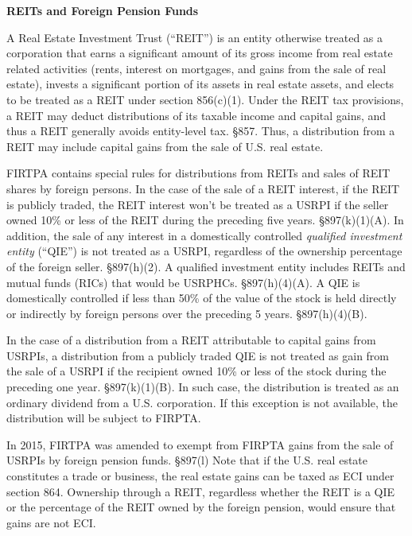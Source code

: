 \begin{center}
\textbf{REITs and Foreign Pension Funds}
\end{center}

A Real Estate Investment Trust (``REIT'') is an entity otherwise treated as a corporation that earns a significant amount of its gross income from real estate related activities (rents, interest on mortgages, and gains from the sale of real estate), invests a significant portion of its assets in real estate assets, and elects to be treated as a REIT under section 856(c)(1).  Under the REIT tax provisions, a REIT may deduct distributions of its taxable income and capital gains, and thus a REIT generally avoids entity-level tax. \S 857.  Thus, a distribution from a REIT may include capital gains from the sale of U.S. real estate.  

FIRTPA contains special rules for distributions from REITs and sales of REIT shares by foreign persons. In the case of the sale of a REIT interest, if the REIT is publicly traded, the REIT interest won't be treated as a USRPI if the seller owned 10\% or less of the REIT during the preceding five years.  \S897(k)(1)(A).  In addition, the sale of any interest in a domestically controlled \emph{qualified investment entity} (``QIE'') is not treated as a USRPI, regardless of the ownership percentage of the foreign seller.  \S897(h)(2).  A qualified investment entity includes REITs and mutual funds (RICs) that would be USRPHCs.  \S897(h)(4)(A).  A QIE is domestically controlled if less than 50\% of the value of the stock is held directly or indirectly by foreign persons over the preceding 5 years.  \S897(h)(4)(B).

In the case of a distribution from a REIT attributable to capital gains from USRPIs, a distribution from a publicly traded QIE is not treated as gain from the sale of a USRPI if the recipient owned 10\% or less of the stock during the preceding one year.  \S897(k)(1)(B).  In such case, the distribution is treated as an ordinary dividend from a U.S. corporation.  If this exception is not available, the distribution will be subject to FIRPTA. 

In 2015, FIRTPA was amended to exempt from FIRPTA gains from the sale of USRPIs by foreign pension funds.   \S897(l)  Note that if the U.S. real estate constitutes a trade or business, the real estate gains can be taxed as ECI under section 864.  Ownership through a REIT, regardless whether the REIT is a QIE or the percentage of the REIT owned by the foreign pension, would ensure that gains are not ECI.

